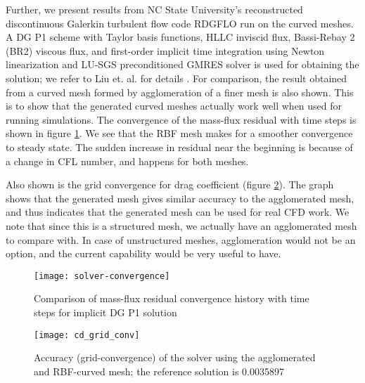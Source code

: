 Further, we present results from NC State University's reconstructed discontinuous Galerkin turbulent flow code RDGFLO run on the curved meshes. A DG P1 scheme with Taylor basis functions, HLLC inviscid flux, Bassi-Rebay 2 (BR2) viscous flux, and first-order implicit time integration using Newton linearization and LU-SGS preconditioned GMRES solver is used for obtaining the solution; we refer to Liu et. al. for details \cite{solver}. For comparison, the result obtained from a curved mesh formed by agglomeration of a finer mesh is also shown. This is to show that the generated curved meshes actually work well when used for running simulations. The convergence of the mass-flux residual with time steps is shown in figure \ref{fig:resconvergence}. We see that the RBF mesh makes for a smoother convergence to steady state. The sudden increase in residual near the beginning is because of a change in CFL number, and happens for both meshes.

Also shown is the grid convergence for drag coefficient (figure \ref{fig:gridconvergence}). The graph shows that the generated mesh gives similar accuracy to the agglomerated mesh, and thus indicates that the generated mesh can be used for real CFD work. We note that since this is a structured mesh, we actually have an agglomerated mesh to compare with. In case of unstructured meshes, agglomeration would not be an option, and the current capability would be very useful to have.
\begin{figure}
	\centering
	\texttt{[image: solver-convergence]}
	\caption{Comparison of mass-flux residual convergence history with time steps for implicit DG P1 solution}
	\label{fig:resconvergence}
\end{figure}

\begin{figure}
	\centering
	\texttt{[image: cd\_grid\_conv]}
	\caption{Accuracy (grid-convergence) of the solver using the agglomerated and RBF-curved mesh; the reference solution \cite{case:bump3d} is 0.0035897}
	\label{fig:gridconvergence}
\end{figure}